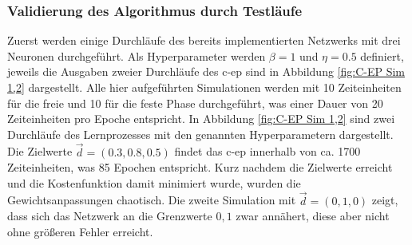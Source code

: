 \subsubsection{Validierung des Algorithmus durch Testläufe}
\label{chap:Validierung des Algorithmus durch Testläufe}

Zuerst werden einige Durchläufe des bereits implementierten Netzwerks mit drei Neuronen durchgeführt. Als Hyperparameter werden \(\beta=1\) und \(\eta=0.5\) definiert, jeweils die Ausgaben zweier Durchläufe des \ac{c-ep} sind in Abbildung \ref{fig:C-EP Sim 1,2} dargestellt. Alle hier aufgeführten Simulationen werden mit 10 Zeiteinheiten für die freie und 10 für die feste Phase durchgeführt, was einer Dauer von 20 Zeiteinheiten pro Epoche entspricht. In Abbildung \ref{fig:C-EP Sim 1,2} sind zwei Durchläufe des Lernprozesses mit den genannten Hyperparametern dargestellt. Die Zielwerte \(\vec{d}=(0.3,0.8,0.5)\) findet das \ac{c-ep} innerhalb von ca. 1700 Zeiteinheiten, was 85 Epochen entspricht. Kurz nachdem die Zielwerte erreicht und die Kostenfunktion damit minimiert wurde, wurden die Gewichtsanpassungen chaotisch. Die zweite Simulation mit \(\vec{d}=(0,1,0)\) zeigt, dass sich das Netzwerk an die Grenzwerte \(0,1\) zwar annähert, diese aber nicht ohne größeren Fehler erreicht.

